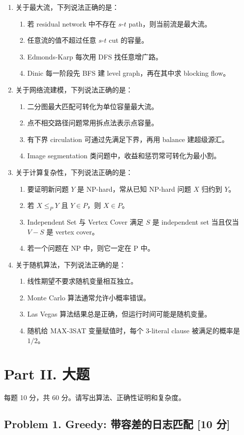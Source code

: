 \documentclass[UTF8,a4paper,11pt]{ctexart}
\newcommand{\choice}[1]{\item[$\square$] #1}
\newcommand{\points}[1]{\hfill{\small\textbf{[#1 分]}}}
\begin{document}
\begin{enumerate}
  \item 关于最大流，下列说法正确的是：
  \begin{enumerate}
    \choice{若 residual network 中不存在 $s$-$t$ path，则当前流是最大流。}
    \choice{任意流的值不超过任意 $s$-$t$ cut 的容量。}
    \choice{Edmonds-Karp 每次用 DFS 找任意增广路。}
    \choice{Dinic 每一阶段先 BFS 建 level graph，再在其中求 blocking flow。}
  \end{enumerate}

  \item 关于网络流建模，下列说法正确的是：
  \begin{enumerate}
    \choice{二分图最大匹配可转化为单位容量最大流。}
    \choice{点不相交路径问题常用拆点法表示点容量。}
    \choice{有下界 circulation 可通过先满足下界，再用 balance 建超级源汇。}
    \choice{Image segmentation 类问题中，收益和惩罚常可转化为最小割。}
  \end{enumerate}

  \item 关于计算复杂性，下列说法正确的是：
  \begin{enumerate}
    \choice{要证明新问题 $Y$ 是 NP-hard，常从已知 NP-hard 问题 $X$ 归约到 $Y$。}
    \choice{若 $X\le_P Y$ 且 $Y\in P$，则 $X\in P$。}
    \choice{Independent Set 与 Vertex Cover 满足 $S$ 是 independent set 当且仅当 $V-S$ 是 vertex cover。}
    \choice{若一个问题在 NP 中，则它一定在 P 中。}
  \end{enumerate}

  \item 关于随机算法，下列说法正确的是：
  \begin{enumerate}
    \choice{线性期望不要求随机变量相互独立。}
    \choice{Monte Carlo 算法通常允许小概率错误。}
    \choice{Las Vegas 算法结果总是正确，但运行时间可能是随机变量。}
    \choice{随机给 MAX-3SAT 变量赋值时，每个 3-literal clause 被满足的概率是 $1/2$。}
  \end{enumerate}
\end{enumerate}

\newpage
\section*{Part II. 大题}

每题 10 分，共 60 分。请写出算法、正确性证明和复杂度。

\subsection*{Problem 1. Greedy: 带容差的日志匹配 \points{10}}
\end{document}
